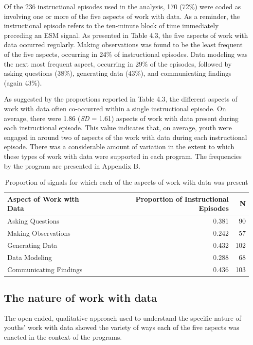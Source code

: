 \documentclass[]{book}
\theoremstyle{definition}
\theoremstyle{definition}
\theoremstyle{definition}
\theoremstyle{remark}
\begin{document}
Of the 236 instructional episodes used in the analysis, 170 (72\%) were
coded as involving one or more of the five aspects of work with data. As
a reminder, the instructional episode refers to the ten-minute block of
time immediately preceding an ESM signal. As presented in Table 4.3, the
five aspects of work with data occurred regularly. Making observations
was found to be the least frequent of the five aspects, occurring in
24\% of instructional episodes. Data modeling was the next most frequent
aspect, occurring in 29\% of the episodes, followed by asking questions
(38\%), generating data (43\%), and communicating findings (again 43\%).

As suggested by the proportions reported in Table 4.3, the different
aspects of work with data often co-occurred within a single
instructional episode. On average, there were 1.86 (\emph{SD} = 1.61)
aspects of work with data present during each instructional episode.
This value indicates that, on average, youth were engaged in around two
of aspects of the work with data during each instructional episode.
There was a considerable amount of variation in the extent to which
these types of work with data were supported in each program. The
frequencies by the program are presented in Appendix B.

\begin{table}

\caption{\label{tab:unnamed-chunk-9}Proportion of signals for which each of the aspects of work with data was present}
\centering
\begin{tabular}[t]{lrr}
\toprule
Aspect of Work with Data & Proportion of Instructional Episodes & N\\
\midrule
Asking Questions & 0.381 & 90\\
Making Observations & 0.242 & 57\\
Generating Data & 0.432 & 102\\
Data Modeling & 0.288 & 68\\
Communicating Findings & 0.436 & 103\\
\bottomrule
\end{tabular}
\end{table}

\subsection{The nature of work with
data}\label{the-nature-of-work-with-data}

The open-ended, qualitative approach used to understand the specific
nature of youths' work with data showed the variety of ways each of the
five aspects was enacted in the context of the programs.
\end{document}
